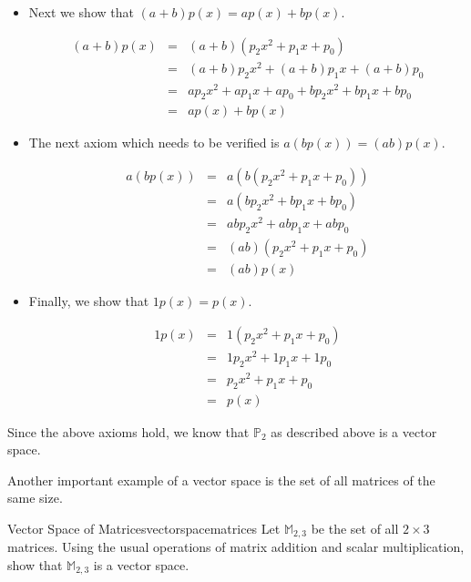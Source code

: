 \begin{solution}
\begin{itemize}
\item
Next we show that $(a+b) p(x) = ap(x) + bp(x)$. 

\begin{eqnarray*} 
(a+b) p(x) &=& (a+b) ( p_2x^2 + p_1x + p_0)\\
&=& (a+b)p_2x^2 + (a+b)p_1x + (a+b)p_0   \\
&=&  ap_2x^2 + ap_1x + ap_0 + bp_2x^2 +bp_1x + bp_0\\
&=& ap(x) + bp(x)
\end{eqnarray*}

\item
The next axiom which needs to be verified is $a(bp(x)) = (ab)p(x)$. 

\begin{eqnarray*}
a(bp(x)) &=& a \left(  b \left(p_2x^2 + p_1x +p_0\right)\right) \\
&=& a \left(  bp_2x^2 +bp_1x + bp_0 \right)\\
&=&  abp_2x^2 + abp_1x + abp_0 \\
&=& (ab) \left( p_2x^2 +p_1x + p_0 \right)\\
&=& (ab) p(x) 
\end{eqnarray*}

\item 
Finally, we show that $1p(x) = p(x)$. 

\begin{eqnarray*}
1p(x) &=& 1 \left(  p_2x^2  + p_1x +  p_0\right)\\
&=&  1p_2x^2 + 1p_1x + 1p_0\\
&=&  p_2x^2 + p_1x + p_0\\
&=& p(x)
\end{eqnarray*}

\end{itemize}

Since the above axioms hold, we know that $\mathbb{P}_2$ as described above is a vector space. 
\end{solution}

Another important example of a vector space is the set of all matrices of the same size. 

\begin{example}{Vector Space of Matrices}{vectorspacematrices}
Let $\mathbb{M}_{2,3}$ be the set of all $2 \times 3$ matrices. Using the usual operations of matrix addition and scalar multiplication, show that $\mathbb{M}_{2,3}$ is a vector space. 
\end{example}

